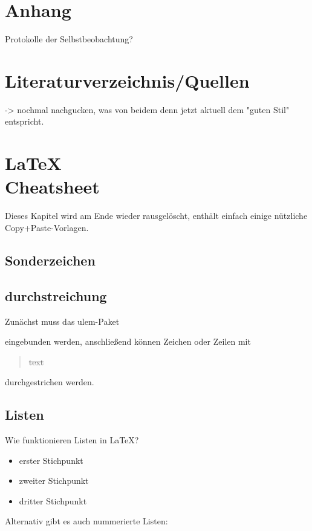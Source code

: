 \documentclass[11pt,a4paper,twoside]{scrreprt}
\begin{document}
\chapter{Anhang}
Protokolle der Selbstbeobachtung? 



\chapter{Literaturverzeichnis/Quellen}
-> nochmal nachgucken, was von beidem denn jetzt aktuell dem "guten Stil" entspricht.
\printbibliography

\iffalse

\chapter{\LaTeX{}\\Cheatsheet}
Dieses Kapitel wird am Ende wieder rausgelöscht, enthält einfach einige nützliche Copy+Paste-Vorlagen.
\section{Sonderzeichen}
\textcopyright
\textregistered
\texttrademark

\section{durchstreichung}
Zunächst muss das ulem-Paket \begin{code}\usepackage{ulem}\end{code} eingebunden werden, anschließend können Zeichen oder Zeilen mit \begin{quotation}\sout{text}\end{quotation} durchgestrichen werden.


\section{Listen}

Wie funktionieren Listen in \LaTeX{}?\\

\begin{itemize}
\item erster Stichpunkt 
\item zweiter Stichpunkt
\item dritter Stichpunkt
\end{itemize}

Alternativ gibt es auch nummerierte Listen:
\end{document}
